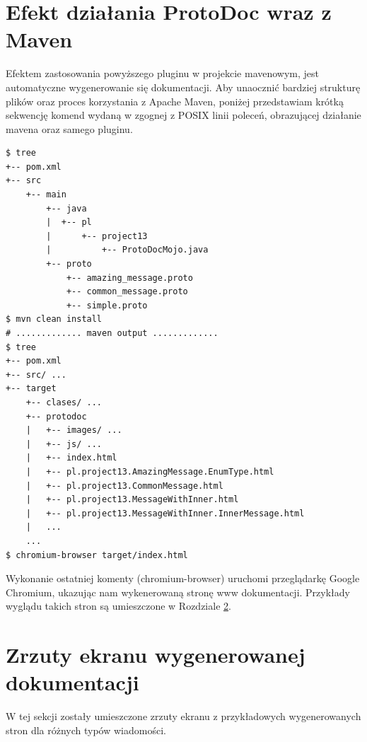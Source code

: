 \documentclass[pdflatex,11pt]{aghdpl}
\begin{document}
\section{Efekt działania ProtoDoc wraz z Maven}
Efektem zastosowania powyższego pluginu w projekcie mavenowym, jest automatyczne wygenerowanie się dokumentacji.
Aby unaocznić bardziej strukturę plików oraz proces korzystania z Apache Maven, poniżej przedstawiam krótką sekwencję komend
wydaną w zgognej z POSIX linii poleceń, obrazującej działanie mavena oraz samego pluginu.

\begin{verbatim}
$ tree
+-- pom.xml
+-- src
    +-- main
        +-- java
        |  +-- pl
        |      +-- project13
        |          +-- ProtoDocMojo.java
        +-- proto
            +-- amazing_message.proto
            +-- common_message.proto
            +-- simple.proto
$ mvn clean install
# ............. maven output .............
$ tree
+-- pom.xml
+-- src/ ...
+-- target
    +-- clases/ ...
    +-- protodoc
    |   +-- images/ ...
    |   +-- js/ ...
    |   +-- index.html 
    |   +-- pl.project13.AmazingMessage.EnumType.html
    |   +-- pl.project13.CommonMessage.html
    |   +-- pl.project13.MessageWithInner.html
    |   +-- pl.project13.MessageWithInner.InnerMessage.html
    |   ...
    ...
$ chromium-browser target/index.html
\end{verbatim}

Wykonanie ostatniej komenty (chromium-browser) uruchomi przeglądarkę Google Chromium, ukazując nam wykenerowaną stronę www dokumentacji.
Przykłady wyglądu takich stron są umieszczone w Rozdziale \ref{sec:screenshots}.

\newpage
\section{Zrzuty ekranu wygenerowanej dokumentacji}
\label{sec:screenshots}
W tej sekcji zostały umieszczone zrzuty ekranu z przykładowych wygenerowanych stron dla różnych typów wiadomości.
\end{document}
